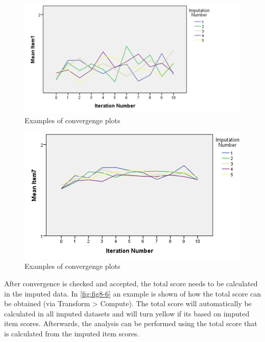 \documentclass[
]{book}
\begin{document}
\begin{figure}

{\centering \includegraphics[width=0.9\linewidth]{images/fig8.5a} 

}

\caption{Examples of convergenge plots}\label{fig:fig8-5-1}
\end{figure}
\begin{figure}

{\centering \includegraphics[width=0.9\linewidth]{images/fig8.5b} 

}

\caption{Examples of convergenge plots}\label{fig:fig8-5-2}
\end{figure}

After convergence is checked and accepted, the total score needs to be calculated in the imputed data. In \ref{fig:fig8-6} an example is shown of how the total score can be obtained (via Transform \textgreater{} Compute). The total score will automatically be calculated in all imputed datasets and will turn yellow if its based on imputed item scores. Afterwards, the analysis can be performed using the total score that is calculated from the imputed item scores.
\end{document}
